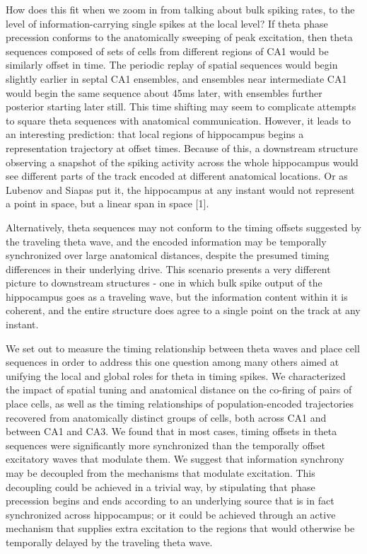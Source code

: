\documentclass[]{article}
\begin{document}
How does this fit when we zoom in from talking about bulk spiking rates,
to the level of information-carrying single spikes at the local level?
If theta phase precession conforms to the anatomically sweeping of peak
excitation, then theta sequences composed of sets of cells from
different regions of CA1 would be similarly offset in time. The periodic
replay of spatial sequences would begin slightly earlier in septal CA1
ensembles, and ensembles near intermediate CA1 would begin the same
sequence about 45ms later, with ensembles further posterior starting
later still. This time shifting may seem to complicate attempts to
square theta sequences with anatomical communication. However, it leads
to an interesting prediction: that local regions of hippocampus begins a
representation trajectory at offset times. Because of this, a downstream
structure observing a snapshot of the spiking activity across the whole
hippocampus would see different parts of the track encoded at different
anatomical locations. Or as Lubenov and Siapas put it, the hippocampus
at any instant would not represent a point in space, but a linear span
in space {[}1{]}.

Alternatively, theta sequences may not conform to the timing offsets
suggested by the traveling theta wave, and the encoded information may
be temporally synchronized over large anatomical distances, despite the
presumed timing differences in their underlying drive. This scenario
presents a very different picture to downstream structures - one in
which bulk spike output of the hippocampus goes as a traveling wave, but
the information content within it is coherent, and the entire structure
does agree to a single point on the track at any instant.

We set out to measure the timing relationship between theta waves and
place cell sequences in order to address this one question among many
others aimed at unifying the local and global roles for theta in timing
spikes. We characterized the impact of spatial tuning and anatomical
distance on the co-firing of pairs of place cells, as well as the timing
relationships of population-encoded trajectories recovered from
anatomically distinct groups of cells, both across CA1 and between CA1
and CA3. We found that in most cases, timing offsets in theta sequences
were significantly more synchronized than the temporally offset
excitatory waves that modulate them. We suggest that information
synchrony may be decoupled from the mechanisms that modulate excitation.
This decoupling could be achieved in a trivial way, by stipulating that
phase precession begins and ends according to an underlying source that
is in fact synchronized across hippocampus; or it could be achieved
through an active mechanism that supplies extra excitation to the
regions that would otherwise be temporally delayed by the traveling
theta wave.
\end{document}
